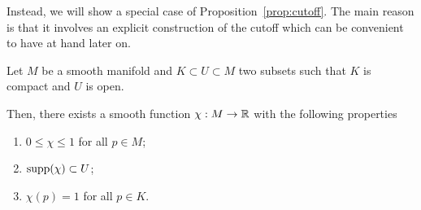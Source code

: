 Instead, we will show a special case of Proposition~\ref{prop:cutoff}. The main reason is that it involves an explicit construction of the cutoff which can be convenient to have at hand later on.

\begin{lem}
  Let $M$ be a smooth manifold and $K\subset U\subset M$ two subsets such that $K$ is compact and $U$ is open.
  
  Then, there exists a smooth function $\chi: M \to\mathbb{R}$ with the following properties
  \begin{enumerate}
    \item $0 \leq \chi \leq 1$ for all $p\in M$;
    \item $\operatorname{supp}(\chi)\subset U$;
    \item $\chi(p) = 1$ for all $p\in K$.
  \end{enumerate}
\end{lem}
